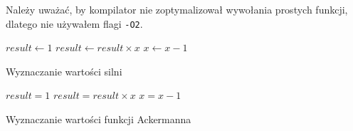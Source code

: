 \documentclass[prodmode]{acmsmall}
\begin{document}
Należy uważać, by kompilator nie zoptymalizował wywołania prostych funkcji, dlatego nie używałem flagi \verb+-O2+.

\begin{algorithm}[t]
\SetAlgoNoLine
{}
$result \leftarrow 1$\;
 {
	$result \leftarrow result \times x$\;
	$x \leftarrow x - 1$
}
\caption{Wyznaczanie wartości silni}
\label{alg:silnia}
\end{algorithm}


\begin{algorithm}[t]
\SetAlgoNoLine
{}
$result = 1$\;
 {
	$result = result \times x$\;
	$x = x - 1$
}
\caption{Wyznaczanie wartości funkcji Ackermanna}
\label{alg:ackermann}
\end{algorithm}








\end{document}
